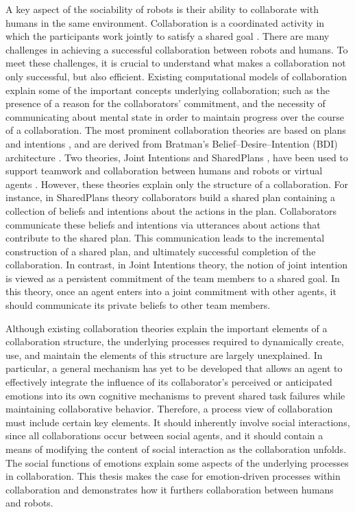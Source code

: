 \documentclass[12pt]{report}
\begin{document}
A key aspect of the sociability of robots is their ability to collaborate with
humans in the same environment. Collaboration is a coordinated activity in which
the participants work jointly to satisfy a shared goal
\cite{grosz:plans-discourse}. There are many challenges in achieving a
successful collaboration between robots and humans. To meet these challenges, it
is crucial to understand what makes a collaboration not only successful, but
also efficient. Existing computational models of collaboration explain some of
the important concepts underlying collaboration; such as the presence of a
reason for the collaborators' commitment, and the necessity of communicating
about mental state in order to maintain progress over the course of a
collaboration. The most prominent collaboration theories are based on plans and
intentions \cite{cohen:teamwork} \cite{grosz:plans-discourse}
\cite{Litman:discourse-commonsense}, and are derived from Bratman's
Belief--Desire--Intention (BDI) architecture \cite{bratman:intentions-plans}.
Two theories, Joint Intentions \cite{cohen:teamwork} and SharedPlans
\cite{grosz:planning-acting,grosz:collaboration,grosz:plans-discourse}, have
been used to support teamwork and collaboration between humans and robots or
virtual agents \cite{breazeal:humanoid-robots}
\cite{montreuil:planning-robot-activity} \cite{sidner:enagagement-robot}
\cite{yen:cast}. However, these theories explain only the structure of a
collaboration. For instance, in SharedPlans theory collaborators build a shared
plan containing a collection of beliefs and intentions about the actions in the
plan. Collaborators communicate these beliefs and intentions via utterances
about actions that contribute to the shared plan. This communication leads to
the incremental construction of a shared plan, and ultimately successful
completion of the collaboration. In contrast, in Joint Intentions theory, the
notion of joint intention is viewed as a persistent commitment of the team
members to a shared goal. In this theory, once an agent enters into a joint
commitment with other agents, it should communicate its private beliefs to other
team members.

Although existing collaboration theories explain the important elements of a
collaboration structure, the underlying processes required to dynamically
create, use, and maintain the elements of this structure are largely
unexplained. In particular, a general mechanism has yet to be developed that
allows an agent to effectively integrate the influence of its collaborator's
perceived or anticipated emotions into its own cognitive mechanisms to prevent
shared task failures while maintaining collaborative behavior. Therefore, a
process view of collaboration must include certain key elements. It should
inherently involve social interactions, since all collaborations occur between
social agents, and it should contain a means of modifying the content of social
interaction as the collaboration unfolds. The social functions of emotions
explain some aspects of the underlying processes in collaboration. This thesis
makes the case for emotion-driven processes within collaboration and
demonstrates how it furthers collaboration between humans and robots.
\end{document}

